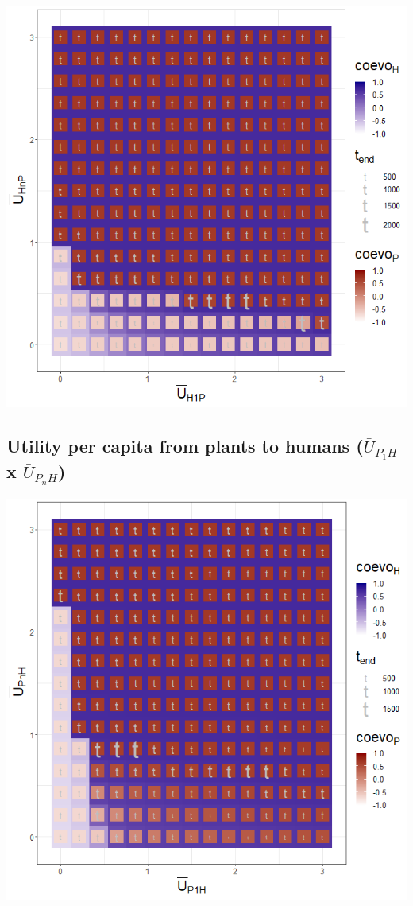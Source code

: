 \documentclass[
]{book}
\begin{document}
\includegraphics[width=1\linewidth]{plots/3_twoPar-mU.H1P-mU.HnP_plot}

\newpage

\hypertarget{utility-per-capita-from-plants-to-humans-baru_p_1h-x-baru_p_nh}{%
\subsection{\texorpdfstring{Utility per capita from plants to humans (\(\bar{U}_{P_{1}H}\) x \(\bar{U}_{P_{n}H}\))}{Utility per capita from plants to humans (\textbackslash bar\{U\}\_\{P\_\{1\}H\} x \textbackslash bar\{U\}\_\{P\_\{n\}H\})}}\label{utility-per-capita-from-plants-to-humans-baru_p_1h-x-baru_p_nh}}


\includegraphics[width=1\linewidth]{plots/3_twoPar-mU.P1H-mU.PnH_plot}
\end{document}
